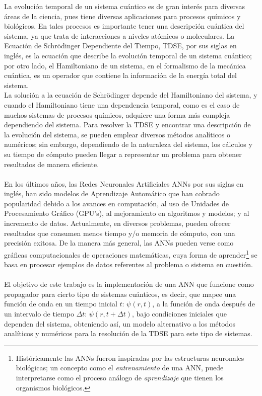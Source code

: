 La evolución temporal de un sistema cuántico es de gran interés para diversas áreas de la ciencia, pues tiene diversas aplicaciones para procesos químicos y biológicos. En tales procesos es importante tener una descripción cuántica del sistema, ya que trata de interacciones a niveles atómicos o moleculares. La Ecuación de Schrödinger Dependiente del Tiempo, \acs{TDSE}, por sus siglas en inglés, es la ecuación que describe la evolución temporal de un sistema cuántico; por otro lado, el Hamiltoniano de un sistema, en el formalismo de la mecánica cuántica, es un operador que contiene la información de la energía total del sistema.
\\
La solución a la ecuación de Schrödinger depende del Hamiltoniano del sistema, y cuando el Hamiltoniano tiene una dependencia temporal, como es el caso de muchos sistemas de procesos químicos, adquiere una forma más compleja dependiendo del sistema. Para resolver la \acs{TDSE} y encontrar una descripción de la evolución del sistema, se pueden emplear diversos métodos analíticos o numéricos; sin embargo, dependiendo de la naturaleza del sistema, los cálculos y su tiempo de cómputo pueden llegar a representar un problema para obtener resultados de manera eficiente.
\\
\\
En los últimos años, las Redes Neuronales Artificiales \acp{ANN} por sus siglas en inglés, han sido modelos de Aprendizaje Automático que han cobrado popularidad debido a los avances en computación, al uso de Unidades de Procesamiento Gráfico (GPU's), al mejoramiento en algoritmos y modelos; y al incremento de datos. Actualmente, en diversos problemas, pueden ofrecer resultados que consumen menos tiempo y/o memoria de cómputo, con una precisión exitosa. De la manera más general, las \acp{ANN} pueden verse como gráficas computacionales de operaciones matemáticas, cuya forma de aprender\footnote{Históricamente las \acp{ANN} fueron inspiradas por las estructuras neuronales biológicas; un concepto como el \emph{entrenamiento} de una \acs{ANN}, puede interpretarse como el proceso análogo de \emph{aprendizaje} que tienen los organismos biológicos.} se basa en procesar ejemplos de datos referentes al problema o sistema en cuestión.
\\
\\
El objetivo de este trabajo es la implementación de una \acs{ANN} que funcione como propagador para cierto tipo de sistemas cuánticos, es decir, que mapee una función de onda en un tiempo inicial $t$: $\psi(r,t)$, a la función de onda después de un intervalo de tiempo $\Delta t$: $\psi(r,t+\Delta t)$, bajo condiciones iniciales que dependen del sistema, obteniendo así, un modelo alternativo a los métodos analíticos y numéricos para la resolución de la \acs{TDSE} para este tipo de sistemas.


